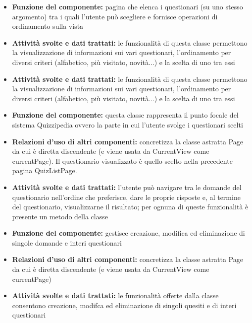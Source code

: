\documentclass[a4paper,11pt]{article}
\begin{document}
			\begin{itemize}
		    \item\textbf{Funzione del componente:} pagina che elenca i questionari (su uno stesso argomento) tra i quali l'utente può scegliere e fornisce operazioni di ordinamento sulla vista
		    \item\textbf{Attività svolte e dati trattati:} le funzionalità di questa classe permettono la visualizzazione di informazioni sui vari questionari, l'ordinamento per diversi criteri (alfabetico, più visitato, novità...) e la scelta di uno tra essi
			\item\textbf{Attività svolte e dati trattati:} le funzionalità di questa classe permettono la visualizzazione di informazioni sui vari questionari, l'ordinamento per diversi criteri (alfabetico, più visitato, novità...) e la scelta di uno tra essi
			\end{itemize}
			\begin{itemize}
		    \item\textbf{Funzione del componente:} questa classe rappresenta il punto focale del sistema Quizzipedia ovvero la parte in cui l'utente svolge i questionari scelti
			\item\textbf{Relazioni d'uso di altri componenti:} concretizza la classe astratta Page da cui è diretta discendente (e viene usata da CurrentView come currentPage). Il questionario visualizzato è quello scelto nella precedente pagina QuizListPage.
			\item\textbf{Attività svolte e dati trattati:} l'utente può navigare tra le domande del questionario nell'ordine che preferisce, dare le proprie risposte e, al termine del questionario, visualizzarne il risultato; per ognuna di queste funzionalità è presente un metodo della classe
			\end{itemize}
			\begin{itemize}
		    \item\textbf{Funzione del componente:} gestisce creazione, modifica ed eliminazione di singole domande e interi questionari
			\item\textbf{Relazioni d'uso di altri componenti:} concretizza la classe astratta Page da cui è diretta discendente (e viene usata da CurrentView come currentPage)
			\item\textbf{Attività svolte e dati trattati:} le funzionalità offerte dalla classe consentono creazione, modifca ed eliminazione di singoli quesiti e di interi questionari
			\end{itemize}
\end{document}
